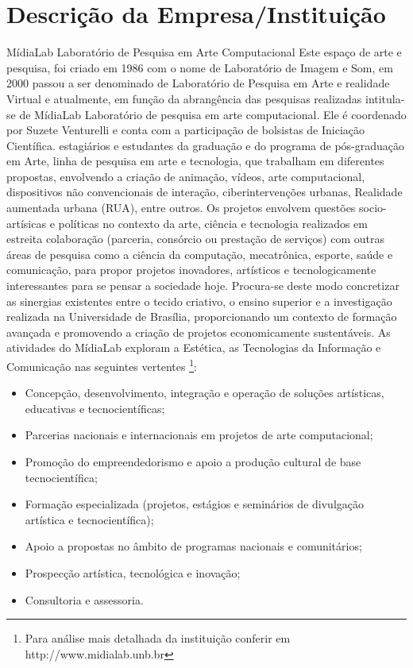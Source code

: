 \chapter{Descrição da Empresa/Instituição}
MídiaLab Laboratório de Pesquisa em Arte Computacional Este espaço de arte e pesquisa, foi criado em 1986 com o nome de Laboratório de Imagem e Som, em 2000 passou a ser denominado de Laboratório de Pesquisa em Arte e realidade Virtual e atualmente, em função da abrangência das pesquisas realizadas intitula-se de MídiaLab Laboratório de pesquisa em arte computacional.
Ele é coordenado por Suzete Venturelli e conta com a participação de bolsistas de Iniciação Científica. estagiários e estudantes da graduação e do programa de pós-graduação em Arte, linha de pesquisa em arte e tecnologia, que trabalham em diferentes propostas, envolvendo a criação de animação, vídeos, arte computacional, dispositivos não convencionais de interação, ciberintervenções urbanas, Realidade aumentada urbana (RUA), entre outros. Os projetos envolvem questões socio-artísicas e políticas no contexto da arte, ciência e tecnologia realizados em estreita colaboração (parceria, consórcio ou prestação de serviços) com outras áreas de pesquisa como a ciência da computação, mecatrônica, esporte, saúde e comunicação, para propor projetos inovadores, artísticos e tecnologicamente interessantes para se pensar a sociedade hoje.
Procura-se deste modo concretizar as sinergias existentes entre o tecido criativo, o ensino superior e a investigação realizada na Universidade de Brasília, proporcionando um contexto de formação avançada e promovendo a criação de projetos economicamente sustentáveis.
As atividades do MídiaLab exploram a Estética, as Tecnologias da Informação e Comunicação nas seguintes vertentes \footnote{Para análise mais detalhada da instituição conferir em http://www.midialab.unb.br}:
\begin{itemize}
\item Concepção, desenvolvimento, integração e operação de soluções artísticas, educativas e tecnocientíficas;
\item Parcerias nacionais e internacionais em projetos de arte computacional;
\item Promoção do empreendedorismo e apoio a produção cultural de base tecnocientífica;
\item Formação especializada (projetos, estágios e seminários de divulgação artística e tecnocientífica);
\item Apoio a propostas no âmbito de programas nacionais e comunitários;
\item Prospecção artística, tecnológica e inovação;
\item Consultoria e assessoria.
\end{itemize}
